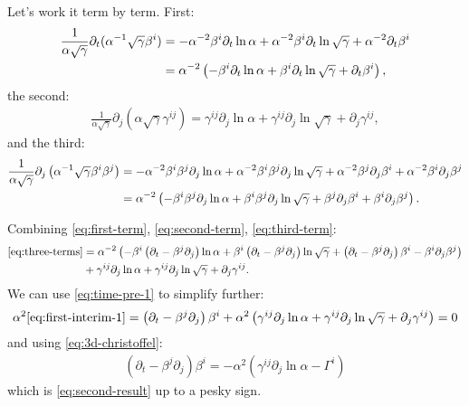 \documentclass[aps,prd,preprint]{revtex4-1}
\begin{document}
Let's work it term by term. First:
\begin{align}
  \frac{1}{\alpha \sqrt{\gamma}} \partial_t (
    \alpha^{-1} \sqrt{\gamma} \beta^i ) & =
    - \alpha^{-2} \beta^i \partial_t \ln \alpha
    + \alpha^{-2} \beta^i \partial_t \ln \sqrt{\gamma}
    + \alpha^{-2} \partial_t \beta^i \notag \\
  & =
    \alpha^{-2} \left(
      - \beta^i \partial_t \ln \alpha
      + \beta^i \partial_t \ln \sqrt{\gamma}
      + \partial_t \beta^i \right) \label{eq:first-term},
\end{align}
the second:
\begin{align}
  \frac{1}{\alpha \sqrt{\gamma}} \partial_j \left(
    \alpha \sqrt{\gamma} \gamma^{ij} \right) =
    \gamma^{ij} \partial_j \ln \alpha
    + \gamma^{ij} \partial_j \ln \sqrt{\gamma}
    + \partial_j \gamma^{ij} \label{eq:second-term},
\end{align}
and the third:
\begin{align}
  \frac{1}{\alpha \sqrt{\gamma}} \partial_j \left(
    \alpha^{-1} \sqrt{\gamma} \beta^i \beta^j \right) & =
    - \alpha^{-2} \beta^i \beta^j \partial_j \ln \alpha
    + \alpha^{-2} \beta^i \beta^j \partial_j \ln \sqrt{\gamma}
    + \alpha^{-2} \beta^j \partial_j \beta^i
    + \alpha^{-2} \beta^i \partial_j \beta^j \notag \\
  & =
    \alpha^{-2} \left(
      - \beta^i \beta^j \partial_j \ln \alpha
      + \beta^i \beta^j \partial_j \ln \sqrt{\gamma}
      + \beta^j \partial_j \beta^i
      + \beta^i \partial_j \beta^j \right) \label{eq:third-term}.
\end{align}

Combining \eqref{eq:first-term}, \eqref{eq:second-term},
\eqref{eq:third-term}:
\begin{align}
  \eqref{eq:three-terms} & = \alpha^{-2} \left(
    - \beta^i \left( \partial_t - \beta^j \partial_j \right) \ln \alpha
    + \beta^i \left(\partial_t - \beta^j \partial_j \right)
      \ln \sqrt{\gamma}
      + \left( \partial_t - \beta^j \partial_j \right) \beta^i
    - \beta^i \partial_j \beta^j \right) \notag \\
  & +
    \gamma^{ij} \partial_j \ln \alpha
    + \gamma^{ij} \partial_j \ln \sqrt{\gamma}
    + \partial_j \gamma^{ij} \label{eq:first-interim-1}.
\end{align}
We can use \eqref{eq:time-pre-1} to simplify further:
\begin{align}
  \alpha^2 \eqref{eq:first-interim-1} =
    \left( \partial_t - \beta^j \partial_j \right) \beta^i
    + \alpha^2 \left( \gamma^{ij} \partial_j \ln \alpha
      + \gamma^{ij} \partial_j \ln \sqrt{\gamma}
      + \partial_j \gamma^{ij} \right) = 0
\end{align}
and using \eqref{eq:3d-christoffel}:
\begin{align}
  \left( \partial_t - \beta^j \partial_j \right) \beta^i =
  - \alpha^2 \left(
    \gamma^{ij} \partial_j \ln \alpha
  - \Gamma^i \right)
\end{align}
which is \eqref{eq:second-result} up to a pesky sign.
\end{document}
